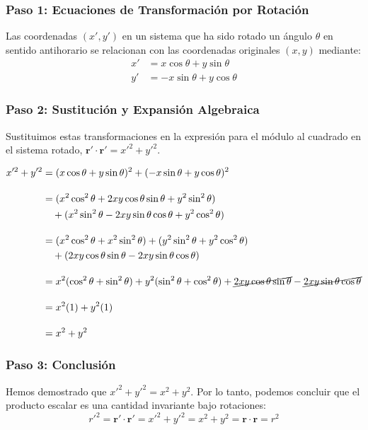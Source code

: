 \documentclass[11pt,a4paper]{article}
\begin{document}
\subsubsection*{Paso 1: Ecuaciones de Transformación por Rotación}
Las coordenadas $(x', y')$ en un sistema que ha sido rotado un ángulo $\theta$ en sentido antihorario se relacionan con las coordenadas originales $(x, y)$ mediante:
\begin{align*}
    x' &= x \cos\theta + y \sin\theta \\
    y' &= -x \sin\theta + y \cos\theta
\end{align*}

\subsubsection*{Paso 2: Sustitución y Expansión Algebraica}
Sustituimos estas transformaciones en la expresión para el módulo al cuadrado en el sistema rotado, $\boldsymbol{r}' \cdot \boldsymbol{r}' = x'^2 + y'^2$.

\begin{align*}
    x'^2 + y'^2 &= (x \cos\theta + y \sin\theta)^2 + (-x \sin\theta + y \cos\theta)^2 \\[1em]
    &= (x^2 \cos^2\theta + 2xy \cos\theta \sin\theta + y^2 \sin^2\theta) \\
    &\quad + (x^2 \sin^2\theta - 2xy \sin\theta \cos\theta + y^2 \cos^2\theta) \\[1em]
    &= (x^2 \cos^2\theta + x^2 \sin^2\theta) + (y^2 \sin^2\theta + y^2 \cos^2\theta) \\
    &\quad + (2xy \cos\theta \sin\theta - 2xy \sin\theta \cos\theta) \\[1em]
    &= x^2(\cos^2\theta + \sin^2\theta) + y^2(\sin^2\theta + \cos^2\theta) + \cancel{2xy \cos\theta \sin\theta} - \cancel{2xy \sin\theta \cos\theta} \\[1em]
    &= x^2(1) + y^2(1) \\[1em]
    &= x^2 + y^2
\end{align*}

\subsubsection*{Paso 3: Conclusión}
Hemos demostrado que $x'^2 + y'^2 = x^2 + y^2$. Por lo tanto, podemos concluir que el producto escalar es una cantidad invariante bajo rotaciones:
\[
\boxed{
{r'}^2=\boldsymbol{r}' \cdot \boldsymbol{r}' = x'^2 + y'^2 = x^2 + y^2 = \boldsymbol{r} \cdot \boldsymbol{r} = r^2
}
\]
\end{document}
